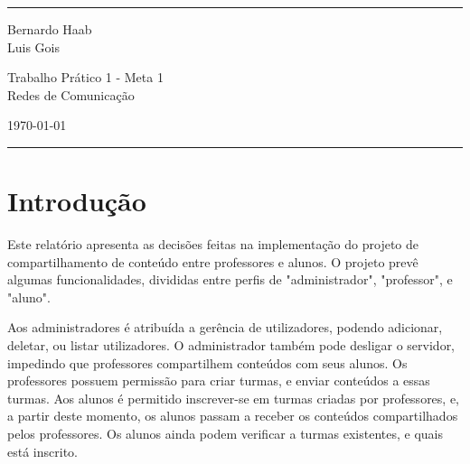 \documentclass[a4paper]{article}
\begin{document}


\fancyhead[C]{}
\hrule \medskip
\begin{minipage}{0.295\textwidth}
\raggedright
\footnotesize
Bernardo Haab  \hfill\\
Luis Gois
\end{minipage}
\begin{minipage}{0.4\textwidth}
\centering
\large
Trabalho  Prático 1 - Meta 1\\
\normalsize
Redes de Comunicação\\
\end{minipage}
\begin{minipage}{0.295\textwidth}
\raggedleft
\today\hfill\\
\end{minipage}
\medskip\hrule
\bigskip

\newenvironment{itemize*}%
  {\begin{itemize}%
    \setlength{\itemsep}{0pt}%
    \setlength{\parskip}{0pt}}%
  {\end{itemize}}

\section{Introdução}

Este relatório apresenta as decisões feitas na implementação do projeto de compartilhamento de conteúdo entre professores e alunos. O projeto prevê algumas funcionalidades, divididas entre perfis de "administrador", "professor", e "aluno".

Aos administradores é atribuída a gerência de utilizadores, podendo adicionar, deletar, ou listar utilizadores. O administrador também pode desligar o servidor, impedindo que professores compartilhem conteúdos com seus alunos. Os professores possuem permissão para criar turmas, e enviar conteúdos a essas turmas. Aos alunos é permitido inscrever-se em turmas criadas por professores, e, a partir deste momento, os alunos passam a receber os conteúdos compartilhados pelos professores. Os alunos ainda podem verificar a turmas existentes, e quais está inscrito.
\end{document}
